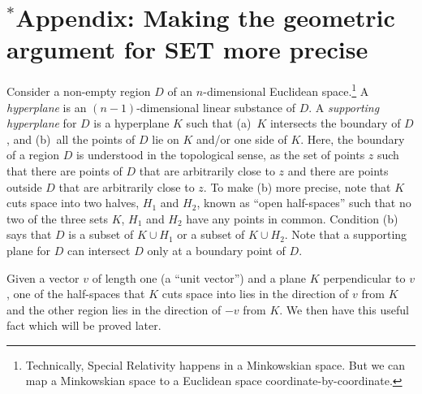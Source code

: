 \section*{$^*$Appendix: Making the geometric argument for SET more precise}
Consider a non-empty region $D$ of an $n$-dimensional Euclidean space.\footnote{Technically, Special Relativity happens in a 
Minkowskian space. But we can map a Minkowskian space to a Euclidean space coordinate-by-coordinate.}
A \textit{hyperplane} is an $(n-1)$-dimensional linear substance of $D$. A \textit{supporting hyperplane} for $D$ is a hyperplane $K$ such that (a)~$K$ intersects the  boundary of $D$, and (b)~all the points of $D$ lie on $K$ and/or one side of $K$. Here, the boundary of a region $D$ is understood in the topological sense, as the set of points $z$ such that there are points of $D$ that are arbitrarily close to $z$ and there are points outside $D$ that are arbitrarily close to $z$. To make (b) more precise, note that $K$ cuts space into two halves, $H_1$ and $H_2$, known as “open half-spaces” such that no two of the three sets $K$, $H_1$ and $H_2$ have any points in common. Condition (b) says that $D$ is a subset of $K\cup H_1$ or a subset of $K\cup H_2$.
Note that a supporting plane for $D$ can intersect $D$ only at a boundary point of $D$. 

Given a vector $v$ of length one (a ``unit vector'') and a plane $K$ perpendicular to $v$, one of the half-spaces that $K$ cuts space into lies in the direction of $v$ from $K$ and the other region lies in the direction of $-v$ from $K$.  We then have this 
useful fact which will be proved later.

